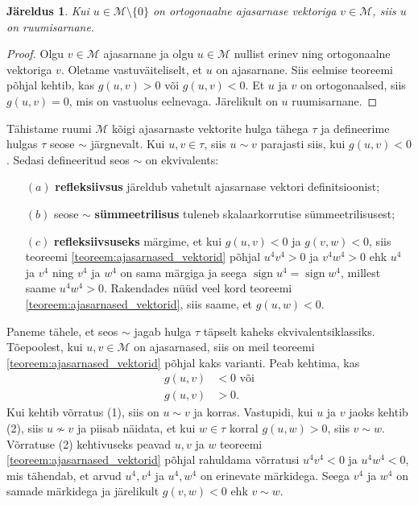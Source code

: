 \documentclass[12pt]{article}
\theoremstyle{plain}
\newtheorem{jareldus}{Järeldus}[section]
\theoremstyle{definition}
\numberwithin{equation}{section}
\def\M{{\mathcal M}}
\DeclareMathOperator{\sign}{sign}
\begin{document}
\begin{jareldus}
Kui $u \in \M \setminus \{0\}$ on ortogonaalne ajasarnase vektoriga 
$v \in \M$, siis $u$ on ruumisarnane.
\end{jareldus}
\begin{proof}
Olgu $v \in \M$ ajasarnane ja olgu $u \in \M$ nullist erinev ning 
ortogonaalne vektoriga $v$. Oletame vastuväiteliselt, et $u$ on 
ajasarnane. Siis eelmise teoreemi põhjal kehtib, kas 
$g\left(u,v\right) > 0$ või $g\left(u,v\right) < 0$. Et $u$ ja $v$ 
on ortogonaalsed, siis $g\left(u,v\right) = 0$, mis on vastuolus 
eelnevaga. Järelikult on $u$ ruumisarnane.
\end{proof}

Tähistame ruumi $\M$ kõigi ajasarnaste vektorite hulga tähega $\tau$ 
ja defineerime hulgas $\tau$ seose $\sim$ järgnevalt. Kui 
$u,v \in \tau$, siis $u \sim v$ parajasti siis, kui 
$g\left(u,v\right) < 0$. Sedasi defineeritud seos $\sim$ on 
ekvivalents:
\begin{itemize}
\item[$(a)$] \textbf{refleksiivsus} järeldub vahetult ajasarnase 
	vektori definitsioonist;
\item[$(b)$] seose $\sim$ \textbf{sümmeetrilisus} tuleneb 
	skalaarkorrutise sümmeetrilisusest;
\item[$(c)$] \textbf{refleksiivsuseks} märgime, et kui 
	$g\left(u,v\right) < 0$ ja $g\left(v, w\right) < 0$, siis 
	teoreemi \ref{teoreem:ajasarnased_vektorid} põhjal 
	$u^4 v^4 > 0$ ja $v^4 w^4 > 0$ ehk $u^4$ ja $v^4$ ning $v^4$ ja 
	$w^4$ on sama märgiga ja seega $\sign u^4 = \sign w^4$, millest 
	saame $u^4 w^4 > 0$. Rakendades nüüd veel kord teoreemi 
	\ref{teoreem:ajasarnased_vektorid}, siis saame, et 
	$g\left(u, w\right) < 0$.
\end{itemize}
Paneme tähele, et seos $\sim$ jagab hulga $\tau$ täpselt kaheks 
ekvivalentsiklassiks. Tõe\-poolest, kui $u, v \in \M$ on ajasarnased, 
siis on meil teoreemi \ref{teoreem:ajasarnased_vektorid} põhjal kaks 
varianti. Peab kehtima, kas 
\begin{align}
g\left(u,v\right) &< 0 \text{ või} \tag{1} \\
g\left(u,v\right) &> 0. \tag{2}
\end{align}
Kui kehtib võrratus (1), siis on $u \sim v$ ja korras. Vastupidi, 
kui $u$ ja $v$ jaoks kehtib (2), siis $u \nsim v$ ja piisab näidata, 
et kui $w \in \tau$ korral $g\left(u,w\right) > 0$, siis $v \sim w$. 
Võrratuse (2) kehtivuseks peavad $u, v$ ja $w$ teoreemi 
\ref{teoreem:ajasarnased_vektorid} põhjal rahuldama võrratusi 
$u^4 v^4 < 0$ ja $u^4 w^4 < 0$, mis tähendab, et arvud $u^4, v^4$ ja 
$u^4, w^4$ on erinevate märkidega. Seega $v^4$ ja $w^4$ on samade 
märkidega ja järelikult $g\left(v,w\right) < 0$ ehk $v \sim w$.
\end{document}

